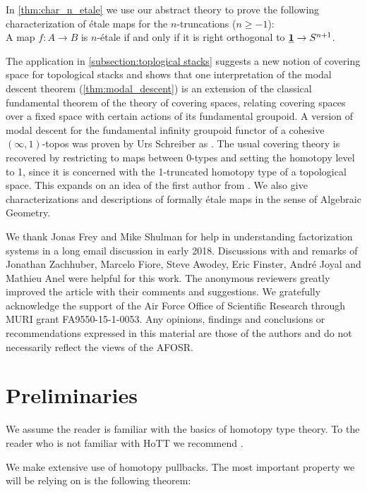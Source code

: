 \documentclass[9pt,twosided]{amsart}
\begin{document}
In \cref{thm:char_n_etale} we use our abstract theory to prove the following characterization of étale maps for the $n$-truncations ($n\geq -1$): \\
A map $f:A\to B$ is $n$-\'etale if and only if it is right orthogonal to $\underline{\mathbf{1}}\to S^{n+1}$.

The application in \cref{subsection:toplogical stacks} suggests a new notion of covering space for topological stacks and shows that
one interpretation of the modal descent theorem (\cref{thm:modal_descent}) is an extension of the classical fundamental theorem of the theory of covering spaces,
relating covering spaces over a fixed space with certain actions of its fundamental groupoid.
A version of modal descent for the fundamental infinity groupoid functor of a cohesive $(\infty,1)$-topos was proven by Urs Schreiber as \cite[Proposition 5.2.42]{SchreiberDcct}.
The usual covering theory is recovered by restricting to maps between 0-types and setting the homotopy level to 1,
since it is concerned with the 1-truncated homotopy type of a topological space.
This expands on an idea of the first author from \cite{wellen-oxford-abstract}.
We also give characterizations and descriptions of formally étale maps in the sense of Algebraic Geometry.
  
We thank Jonas Frey and Mike Shulman for help in understanding factorization systems in a long email discussion in early 2018.
Discussions with and remarks of Jonathan Zachhuber, Marcelo Fiore, Steve Awodey, Eric Finster, André Joyal and Mathieu Anel were helpful for this work.
The anonymous reviewers greatly improved the article with their comments and suggestions. 
We gratefully acknowledge the support of the Air Force Office of Scientific Research through MURI grant FA9550-15-1-0053.
Any opinions, findings and conclusions or recommendations expressed in this material are those of the authors and do not necessarily reflect the views of the AFOSR.


\section{Preliminaries}
We assume the reader is familiar with the basics of homotopy type theory. To the reader who is not familiar with HoTT we recommend \cite{UFP}.

We make extensive use of homotopy pullbacks. The most important property we will be relying on is the following theorem:
\end{document}
